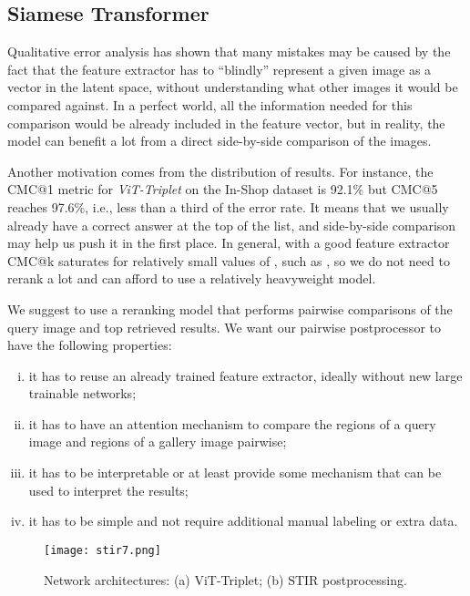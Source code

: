 \documentclass{article}
\begin{document}
\subsection{Siamese Transformer}

Qualitative error analysis has shown that many mistakes may be caused by the fact that the feature extractor has to ``blindly'' represent a given image as a vector in the latent space, without understanding what other images it would be compared against. In a perfect world, all the information needed for this comparison would be already included in the feature vector, but in reality, the model can benefit a lot from a direct side-by-side comparison of the images. 

Another motivation comes from the distribution of results. For instance, the CMC@1 metric for \emph{ViT-Triplet} on the In-Shop dataset is 92.1\% but CMC@5 reaches 97.6\%, i.e., less than a third of the error rate. It means that we usually already have a 
correct answer at the top of the list, and side-by-side comparison may help us push it in the first place. In general, with a good feature extractor CMC@k saturates for relatively small values of , such as , so we do not need to rerank a lot and can afford to use a relatively heavyweight model.

We suggest to use a reranking model that performs pairwise comparisons of the query image and top retrieved results. We want our pairwise postprocessor to have the following properties:
\begin{enumerate}[(i)]
    \item it has to reuse an already trained feature extractor, ideally without new large trainable networks;
    \item it has to have an attention mechanism to compare the regions of a query image and regions of a gallery image pairwise;
    \item it has to be interpretable or at least provide some mechanism that can be used to interpret the results;
    \item it has to be simple and not require additional manual labeling or extra data.
\end{enumerate}

\begin{figure}[!t]
    \centering
    \texttt{[image: stir7.png]}
    \caption{Network architectures: (a) ViT-Triplet; (b) STIR postprocessing.}\label{fig:stir}
\end{figure}
\end{document}
